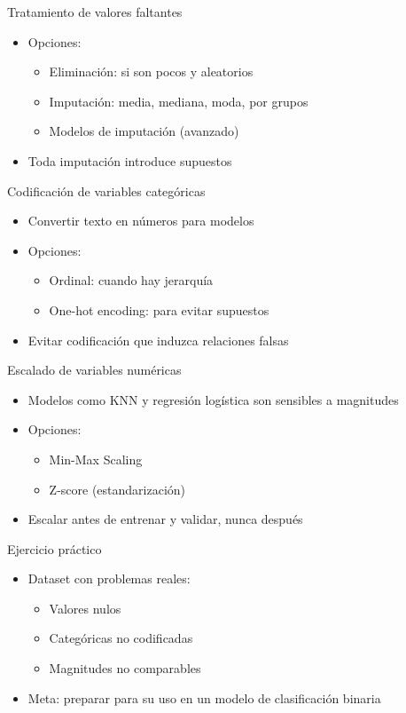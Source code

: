 \documentclass{beamer}
\begin{document}
\begin{frame}{Tratamiento de valores faltantes}
\begin{itemize}
    \item Opciones:
    \begin{itemize}
        \item Eliminación: si son pocos y aleatorios
        \item Imputación: media, mediana, moda, por grupos
        \item Modelos de imputación (avanzado)
    \end{itemize}
    \item Toda imputación introduce supuestos
\end{itemize}
\end{frame}

\begin{frame}{Codificación de variables categóricas}
\begin{itemize}
    \item Convertir texto en números para modelos
    \item Opciones:
    \begin{itemize}
        \item Ordinal: cuando hay jerarquía
        \item One-hot encoding: para evitar supuestos
    \end{itemize}
    \item Evitar codificación que induzca relaciones falsas
\end{itemize}
\end{frame}

\begin{frame}{Escalado de variables numéricas}
\begin{itemize}
    \item Modelos como KNN y regresión logística son sensibles a magnitudes
    \item Opciones:
    \begin{itemize}
        \item Min-Max Scaling
        \item Z-score (estandarización)
    \end{itemize}
    \item Escalar antes de entrenar y validar, nunca después
\end{itemize}
\end{frame}

\begin{frame}{Ejercicio práctico}
\begin{itemize}
    \item Dataset con problemas reales:
    \begin{itemize}
        \item Valores nulos
        \item Categóricas no codificadas
        \item Magnitudes no comparables
    \end{itemize}
    \item Meta: preparar para su uso en un modelo de clasificación binaria
\end{itemize}
\end{frame}
\end{document}
